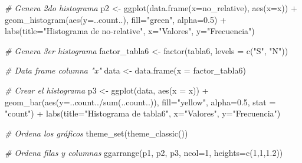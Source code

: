 \documentclass[
]{article}
\newenvironment{Shaded}{\begin{snugshade}}{\end{snugshade}}
\newcommand{\AttributeTok}[1]{\textcolor[rgb]{0.77,0.63,0.00}{#1}}
\newcommand{\CommentTok}[1]{\textcolor[rgb]{0.56,0.35,0.01}{\textit{#1}}}
\newcommand{\DecValTok}[1]{\textcolor[rgb]{0.00,0.00,0.81}{#1}}
\newcommand{\FloatTok}[1]{\textcolor[rgb]{0.00,0.00,0.81}{#1}}
\newcommand{\FunctionTok}[1]{\textcolor[rgb]{0.00,0.00,0.00}{#1}}
\newcommand{\NormalTok}[1]{#1}
\newcommand{\OtherTok}[1]{\textcolor[rgb]{0.56,0.35,0.01}{#1}}
\newcommand{\SpecialCharTok}[1]{\textcolor[rgb]{0.00,0.00,0.00}{#1}}
\newcommand{\StringTok}[1]{\textcolor[rgb]{0.31,0.60,0.02}{#1}}
\begin{document}
\begin{Shaded}
\begin{Highlighting}[]
\CommentTok{\# Genera 2do histograma}
\NormalTok{p2 }\OtherTok{\textless{}{-}} \FunctionTok{ggplot}\NormalTok{(}\FunctionTok{data.frame}\NormalTok{(}\AttributeTok{x=}\NormalTok{no\_relative), }\FunctionTok{aes}\NormalTok{(}\AttributeTok{x=}\NormalTok{x)) }\SpecialCharTok{+} 
  \FunctionTok{geom\_histogram}\NormalTok{(}\FunctionTok{aes}\NormalTok{(}\AttributeTok{y=}\NormalTok{..count..), }\AttributeTok{fill=}\StringTok{"green"}\NormalTok{, }\AttributeTok{alpha=}\FloatTok{0.5}\NormalTok{) }\SpecialCharTok{+}
  \FunctionTok{labs}\NormalTok{(}\AttributeTok{title=}\StringTok{"Histograma de no{-}relative"}\NormalTok{, }\AttributeTok{x=}\StringTok{"Valores"}\NormalTok{, }\AttributeTok{y=}\StringTok{"Frecuencia"}\NormalTok{)}

\CommentTok{\# Genera 3er histograma}
\NormalTok{factor\_tabla6 }\OtherTok{\textless{}{-}} \FunctionTok{factor}\NormalTok{(tabla6, }\AttributeTok{levels =} \FunctionTok{c}\NormalTok{(}\StringTok{"S"}\NormalTok{, }\StringTok{"N"}\NormalTok{))}

\CommentTok{\# Data frame columna "x"}
\NormalTok{data }\OtherTok{\textless{}{-}} \FunctionTok{data.frame}\NormalTok{(}\AttributeTok{x =}\NormalTok{ factor\_tabla6)}

\CommentTok{\# Crear el histograma}
\NormalTok{p3 }\OtherTok{\textless{}{-}} \FunctionTok{ggplot}\NormalTok{(data, }\FunctionTok{aes}\NormalTok{(}\AttributeTok{x =}\NormalTok{ x)) }\SpecialCharTok{+} 
  \FunctionTok{geom\_bar}\NormalTok{(}\FunctionTok{aes}\NormalTok{(}\AttributeTok{y=}\NormalTok{..count..}\SpecialCharTok{/}\FunctionTok{sum}\NormalTok{(..count..)), }\AttributeTok{fill=}\StringTok{"yellow"}\NormalTok{, }\AttributeTok{alpha=}\FloatTok{0.5}\NormalTok{, }\AttributeTok{stat =} \StringTok{"count"}\NormalTok{) }\SpecialCharTok{+}
  \FunctionTok{labs}\NormalTok{(}\AttributeTok{title=}\StringTok{"Histograma de tabla6"}\NormalTok{, }\AttributeTok{x=}\StringTok{"Valores"}\NormalTok{, }\AttributeTok{y=}\StringTok{"Frecuencia"}\NormalTok{)}

\CommentTok{\# Ordena los gráficos }
\FunctionTok{theme\_set}\NormalTok{(}\FunctionTok{theme\_classic}\NormalTok{())}

\CommentTok{\# Ordena filas y columnas}
\FunctionTok{ggarrange}\NormalTok{(p1, p2, p3, }\AttributeTok{ncol=}\DecValTok{1}\NormalTok{, }\AttributeTok{heights=}\FunctionTok{c}\NormalTok{(}\DecValTok{1}\NormalTok{,}\DecValTok{1}\NormalTok{,}\FloatTok{1.2}\NormalTok{))}
\end{Highlighting}
\end{Shaded}
\end{document}

